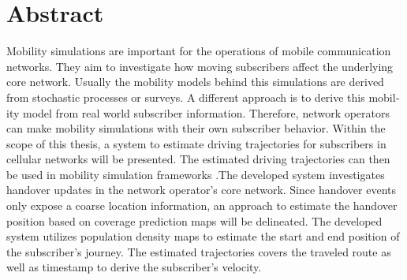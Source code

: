 \documentclass[master,english]{hgbthesis}
\begin{document}
\chapter{Abstract}
\begin{english} %
Mobility simulations are important for the operations of mobile communication networks. They aim to investigate how moving subscribers affect the underlying core network. Usually the mobility models behind this simulations are derived from stochastic processes or surveys. A different approach is to derive this mobility model from real world subscriber information. Therefore, network operators can make mobility simulations with their own subscriber behavior.
Within the scope of this thesis, a system to estimate driving trajectories for subscribers in cellular networks will be presented. The estimated driving trajectories can then be used in mobility simulation frameworks .The developed system investigates handover updates in the network operator’s core network. Since handover events only expose a coarse location information, an approach to estimate the handover position based on coverage prediction maps will be delineated. The developed system utilizes population density maps to estimate the start and end position of the subscriber’s journey. The estimated trajectories covers the traveled route as well as timestamp to derive the subscriber’s velocity.
\end{english}

\mainmatter         %
\end{document}
